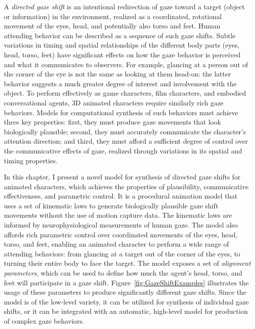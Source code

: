 A \emph{directed gaze shift} is an intentional redirection of gaze toward a target (object or information) in the environment, realized as a coordinated, rotational movement of the eyes, head, and potentially also torso and feet. Human attending behavior can be described as a sequence of such gaze shifts. Subtle variations in timing and spatial relationships of the different body parts (eyes, head, torso, feet) have significant effects on how the gaze behavior is perceived and what it communicates to observers. For example, glancing at a person out of the corner of the eye is not the same as looking at them head-on: the latter behavior suggests a much greater degree of interest and involvement with the object. To perform effectively as game characters, film characters, and embodied conversational agents, 3D animated characters require similarly rich gaze behaviors. Models for computational synthesis of such behaviors must achieve three key properties: first, they must produce gaze movements that look biologically plausible; second, they must accurately communicate the character's attention direction; and third, they must afford a sufficient degree of control over the communicative effects of gaze, realized through variations in its spatial and timing properties.

In this chapter, I present a novel model for synthesis of directed gaze shifts for animated characters, which achieves the properties of plausibility, communicative effectiveness, and parametric control. It is a procedural animation model that uses a set of kinematic laws to generate biologically plausible gaze shift movements without the use of motion capture data. The kinematic laws are informed by neurophysiological measurements of human gaze. The model also affords rich parametric control over coordinated movements of the eyes, head, torso, and feet, enabling an animated character to perform a wide range of attending behaviors: from glancing at a target out of the corner of the eyes, to turning their entire body to face the target. The model exposes a set of \emph{alignment parameters}, which can be used to define how much the agent's head, torso, and feet will participate in a gaze shift. Figure~\ref{fig:GazeShiftExamples} illustrates the usage of these parameters to produce significantly different gaze shifts. Since the model is of the low-level variety, it can be utilized for synthesis of individual gaze shifts, or it can be integrated with an automatic, high-level model for production of complex gaze behaviors.

